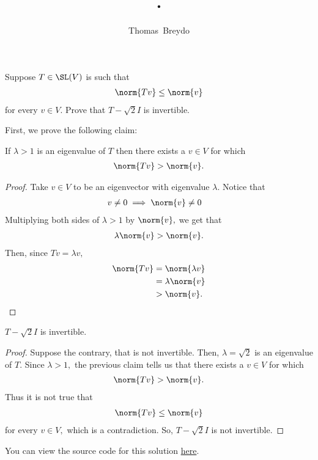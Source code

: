 \documentclass{amsart}
\title{\pagenum.\probnum}
\author{Thomas\ Breydo}
\newcommand{\pagenum}{175}
\newcommand{\probnum}{5}
\begin{document}
\maketitle

\begin{problem*}
Suppose $T\in\SL(V)$ is such that
\begin{align*}
    \norm{Tv}\le\norm{v}
\end{align*}
for every $v\in V.$ Prove that $T-\sqrt2I$ is invertible.
\end{problem*}

\vspace{0.5in}

First, we prove the following claim:

\begin{claim*}
If $\lambda>1$ is an eigenvalue of $T$ then there exists a $v\in V$ for which
\begin{align*}
    \norm{Tv}>\norm{v}.
\end{align*}
\end{claim*}
\begin{proof}
Take $v\in V$ to be an eigenvector with eigenvalue $\lambda.$ Notice that
\begin{align*}
    v\ne0 &\implies \norm{v}\ne0
\end{align*}
Multiplying both sides of $\lambda>1$ by $\norm{v},$ we get that
\begin{align*}
    \lambda\norm{v} > \norm{v}.
\end{align*}
Then, since $Tv=\lambda v,$
\begin{align*}
    \norm{Tv} &= \norm{\lambda v} \\
              &= \lambda\norm{v} \\
              &> \norm{v}.\qedhere
\end{align*}
\end{proof}

\begin{claim*}
    $T-\sqrt2I$ is invertible.
\end{claim*}
\begin{proof}
Suppose the contrary, that is not invertible.
Then, $\lambda=\sqrt2$ is an eigenvalue
of $T.$ Since $\lambda>1,$ the previous claim tells us that
there exists a $v\in V$ for which
\begin{align*}
    \norm{Tv}>\norm{v}.
\end{align*}
Thus it is not true that
\begin{align*}
    \norm{Tv}\le\norm{v}
\end{align*}
for every $v\in V,$ which is a contradiction.
So, $T-\sqrt2I$ is not invertible.
\end{proof}

\vspace{0.5in}

\begin{note*}
You can view the source code for this solution
\href{https://github.com/thomasbreydo/linalg/blob/main/\pagenum_\probnum_Thomas_Breydo.tex}
{here}.
\end{note*}
\end{document}
